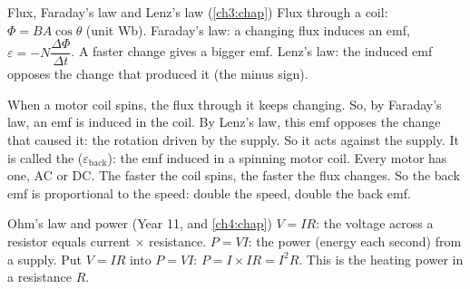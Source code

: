 \begin{refresher}{Flux, Faraday's law and Lenz's law (\cref{ch3:chap})}
Flux through a coil: $\Phi = BA\cos\theta$ (unit \si{Wb}). Faraday's law: a changing
flux induces an emf, $\varepsilon = -N\dfrac{\Delta\Phi}{\Delta t}$. A faster change
gives a bigger emf. Lenz's law: the induced emf opposes the change that produced it
(the minus sign).
\end{refresher}

When a motor coil spins, the flux through it keeps changing. So, by Faraday's law, an
emf is induced in the coil. By Lenz's law, this emf opposes the change that caused it:
the rotation driven by the supply. So it acts against the supply. It is called the
 ($\varepsilon_\mathrm{back}$): the emf induced in a spinning motor coil.
Every motor has one, AC or DC. The faster the coil spins, the faster the flux changes.
So the back emf is proportional to the speed: double the speed, double the back emf.

\begin{refresher}{Ohm's law and power (Year 11, and \cref{ch4:chap})}
$V = IR$: the voltage across a resistor equals current $\times$ resistance. $P = VI$: the
power (energy each second) from a supply. Put $V = IR$ into $P = VI$:
$P = I \times IR = I^2R$. This is the heating power in a resistance $R$.
\end{refresher}

